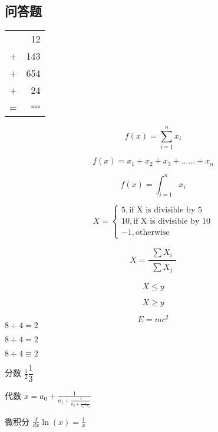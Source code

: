 \documentclass[a4paper,11pt]{article}
\begin{document}
\begin{CJK}{UTF8}{gkai}
\section{问答题}
\begin{tabular}{lr}
&12\\
+&143\\
+&654\\
+&24\\
\hline
=&\small$\square\!\square\!\square$
\end{tabular}

\begin{equation}
	f(x) = \sum_{i=1}^{n} {x_i}
\end{equation}

\begin{equation}
	f(x) = x_1 + x_2 + x_3 + ...... + x_n
\end{equation}

\begin{equation}
	f(x) = \int_{i=1}^{n} {x_i}
\end{equation}

\begin{equation}
	X=
	\begin{cases}
	5, \text{if X is divisible by 5}
	\\
	10, \text{if X is divisible by 10}
	\\
	-1, \text{otherwise}
	\end{cases}
\end{equation}

\begin{equation}
	X = 
	\frac{\substack{\sum{X_i}}}
	{\substack{\sum{X_j}}}
\end{equation}

\begin{equation}
	X \leqslant y %
\end{equation}

\begin{equation}
	X \geqslant y %
\end{equation}

\[ E=mc^2 \]
$8\div4=2$

$8\div4=2$

  $ 8\div 4\equiv 2 $

 
分数
$ \frac{1}2{} \dfrac{1}{3}$

代数
$ x = a_0 + \frac{1}{a_1 + \frac{1}{a_2 + \frac{1}{a_3 + a_4}}} $

微积分 $\frac{d}{dx}\ln(x)=\frac{1}{x}$


\end{CJK}
\end{document}
